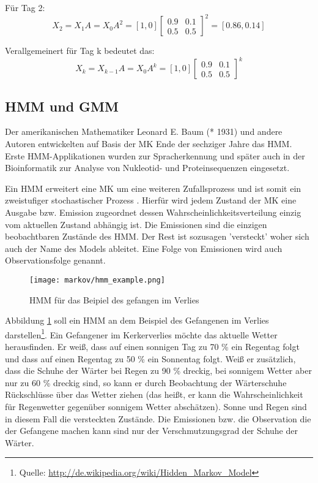 Für Tag 2:\\
\[ X_2 = X_1 A = X_0 A^2 = [ 1, 0 ] \begin {bmatrix} 0.9&0.1\\0.5&0.5 \end {bmatrix}^2 = [ 0.86, 0.14] \] 

Verallgemeinert für Tag k bedeutet das: 
\[ X_k = X_{k-1} A = X_0 A^k = [ 1, 0 ] \begin {bmatrix} 0.9&0.1\\0.5&0.5 \end {bmatrix}^k \] 


\subsection{\acl{HMM} und \acl{GMM}}  \label{sec:hmm}
Der amerikanischen Mathematiker Leonard E. Baum (* 1931) und andere Autoren entwickelten auf Basis der \acl{MK} Ende der 
sechziger Jahre das \acl{HMM}. Erste \acl{HMM}-Applikationen wurden zur Spracherkennung und später auch in der Bioinformatik 
zur Analyse von Nukleotid- und Proteinsequenzen eingesetzt. 

Ein \acl{HMM} erweitert eine \acl{MK} um eine weiteren Zufallsprozess und ist
somit ein zweistufiger stochastischer Prozess \cite[67]{mmmFink}. Hierfür wird
jedem Zustand der \acl{MK} eine Ausgabe bzw. Emission zugeordnet dessen
Wahrscheinlichkeitsverteilung einzig vom aktuellen Zustand abhängig ist. Die
Emissionen sind die einzigen beobachtbaren Zustände des \acl{HMM}. Der Rest
ist sozusagen 'versteckt' woher sich auch der Name des Models ableitet. Eine
Folge von Emissionen wird auch Observationsfolge genannt.

\begin{figure}[htbp] \centering
    \texttt{[image: markov/hmm\_example.png]}
    \caption{\acl{HMM} für das Beipiel des gefangen im Verlies}
    \label{fig:hmm_example}
\end{figure}

Abbildung \ref{fig:hmm_example} soll ein \acl{HMM} an dem Beispiel des
Gefangenen im Verlies darstellen\footnote{Quelle:
\url{http://de.wikipedia.org/wiki/Hidden_Markov_Model}}. Ein Gefangener im
Kerkerverlies möchte das aktuelle Wetter herausfinden. Er weiß, dass auf einen
sonnigen Tag zu 70 \% ein Regentag folgt und dass auf einen Regentag zu 50 \%
ein Sonnentag folgt. Weiß er zusätzlich, dass die Schuhe der Wärter bei Regen zu
90 \% dreckig, bei sonnigem Wetter aber nur zu 60 \% dreckig sind, so kann er
durch Beobachtung der Wärterschuhe Rückschlüsse über das Wetter ziehen (das
heißt, er kann die Wahrscheinlichkeit für Regenwetter gegenüber sonnigem Wetter
abschätzen). Sonne und Regen sind in diesem Fall die versteckten Zustände. Die
Emissionen bzw. die Observation die der Gefangene machen kann sind nur der
Verschmutzungsgrad der Schuhe der Wärter.

